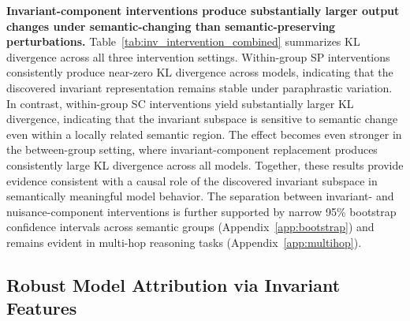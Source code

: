 \textbf{Invariant-component interventions produce substantially larger output changes under semantic-changing than semantic-preserving perturbations.}
Table~\ref{tab:inv_intervention_combined} summarizes KL divergence across all three intervention settings. Within-group SP interventions consistently produce near-zero KL divergence across models, indicating that the discovered invariant representation remains stable under paraphrastic variation. In contrast, within-group SC interventions yield substantially larger KL divergence, indicating that the invariant subspace is sensitive to semantic change even within a locally related semantic region. The effect becomes even stronger in the between-group setting, where invariant-component replacement produces consistently large KL divergence across all models. Together, these results provide evidence consistent with a causal role of the discovered invariant subspace in semantically meaningful model behavior. The separation between invariant- and nuisance-component interventions is further supported by narrow 95\% bootstrap confidence intervals across semantic groups (Appendix~\ref{app:bootstrap}) and remains evident in multi-hop reasoning tasks (Appendix~\ref{app:multihop}).


\subsection{Robust Model Attribution via Invariant Features}

